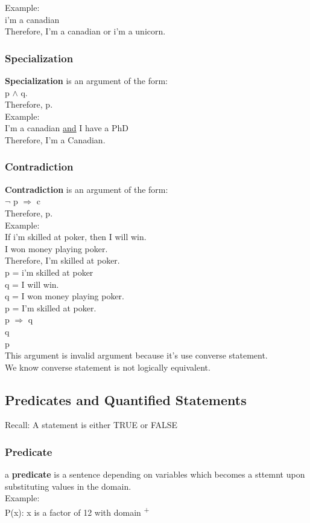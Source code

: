 \documentclass[11pt]{article}
\begin{document}
Example:\\
i'm a canadian\\
Therefore, I'm a canadian or i'm a unicorn.\\


\subsubsection{Specialization}
\label{sec:org4bb6121}
\textbf{Specialization} is an argument of the form:\\
p \(\land\) q.\\
Therefore, p.\\

Example:\\
I'm a canadian \uline{and} I have a PhD\\
Therefore, I'm a Canadian.\\


\subsubsection{Contradiction}
\label{sec:org3e30028}
\textbf{Contradiction} is an argument of the form:\\
\(\neg{}\) p \(\Rightarrow\) c\\
Therefore, p.\\

Example:\\
If i'm skilled at poker, then I will win.\\
I won money playing poker.\\
Therefore, I'm skilled at poker.\\

p = i'm skilled at poker\\
q = I will win.\\
q = I won money playing poker.\\
p = I'm skilled at poker.\\

p \(\Rightarrow\) q\\
q\\
p\\

This argument is invalid argument because it's use converse statement.\\
We know converse statement is not logically equivalent.\\


\subsection{Predicates and Quantified Statements}
\label{sec:orgb2b64ac}
Recall: A statement is either TRUE or FALSE\\

\subsubsection{Predicate}
\label{sec:orgbff30dd}
a \textbf{predicate} is a sentence depending on variables which becomes a sttemnt upon substituting values in the domain.\\

Example:\\
P(x): x is a factor of 12 with domain \textsuperscript{+}\\
\end{document}
